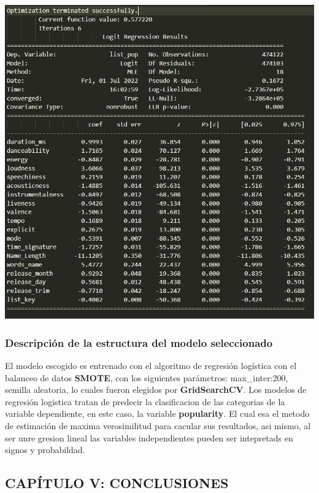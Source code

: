 \documentclass[
  letterpaper,
  DIV=11,
  numbers=noendperiod]{scrartcl}
\begin{document}
\includegraphics{mejor-modelo.jpg}

\hypertarget{descripciuxf3n-de-la-estructura-del-modelo-seleccionado}{%
\subsubsection{Descripción de la estructura del modelo
seleccionado}\label{descripciuxf3n-de-la-estructura-del-modelo-seleccionado}}

El modelo escogido es entrenado con el algoritmo de regresión logística
con el balanceo de datos \textbf{SMOTE}, con los siguientes parámetros:
max\_inter:200, semilla aleatoria, lo cuales fueron elegidos por
\textbf{GridSearchCV}. Los modelos de regresión logistica tratan de
predecir la clasificacion de las categorias de la variable dependiente,
en este caso, la variable \textbf{popularity}. El cual esa el metodo de
estimación de maxima verosimilitud para cacular sus resultados, asi
mismo, al ser unre gresion lineal las variables independientes pueden
ser intepretads en signos y probabildad.

\hypertarget{capuxedtulo-v-conclusiones}{%
\subsection{CAPÍTULO V: CONCLUSIONES}\label{capuxedtulo-v-conclusiones}}
\end{document}

